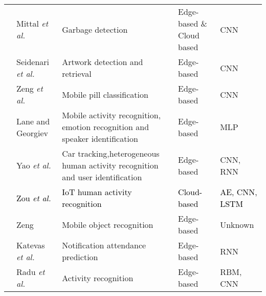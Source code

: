 \documentclass[journal,comsoc,letter]{IEEEtran}
\newcommand{\edit}[1]{\textcolor{black}{#1}}
\begin{document}
\begin{table*}[t!]
\begin{tabular}{|c|C{3.5cm}|C{5cm}|C{1.8cm}|C{2.3cm}|}
                                             & Mittal \emph{et al.} \cite{mittal2016spotgarbage}             & Garbage detection                                                             & Edge-based \& Cloud based      & CNN                      \\  
                                             & Seidenari \emph{et al.} \cite{seidenari2017deep}              & Artwork detection and retrieval                                               & Edge-based                     & CNN                      \\  
                                             & Zeng \emph{et al.} \cite{zeng2017mobiledeeppill}              & Mobile pill classification                                                    & Edge-based                     & CNN                      \\  
                                            & Lane and Georgiev \cite{lane2015can}                          & Mobile activity recognition, emotion recognition and speaker identification   & Edge-based                     & MLP                      \\  
                                            & Yao \emph{et al.} \cite{yao2017deepsense}                     & Car tracking,heterogeneous human activity recognition and user identification & Edge-based                     & CNN, RNN                 \\  
                                            & \edit{Zou \emph{et al.} \cite{zoudeepsense}}                    & \edit{IoT human activity recognition}                                           & \edit{Cloud-based}               & \edit{AE, CNN, LSTM}       \\  
                                             & Zeng \cite{zeng2017mobile}                                    & Mobile object recognition                                                     & Edge-based                     & Unknown                  \\  
                                             & Katevas \emph{et al.} \cite{katevas2017practical}             & Notification attendance prediction                                            & Edge-based                     & RNN                      \\  
                                             & Radu \emph{et al.} \cite{radu2016towards}                     & Activity recognition                                                          & Edge-based                     & RBM, CNN                 \\  

\end{tabular}
\end{table*}
\end{document}
